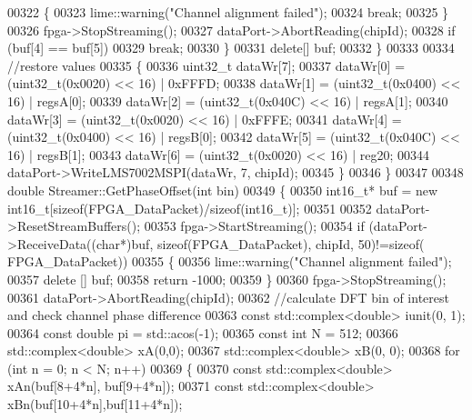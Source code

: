 \begin{DoxyCode}
00322             \{
00323                 lime::warning(\textcolor{stringliteral}{"Channel alignment failed"});
00324                 \textcolor{keywordflow}{break};
00325             \}
00326             fpga->StopStreaming();
00327             dataPort->AbortReading(chipId);
00328             \textcolor{keywordflow}{if} (buf[4] == buf[5])
00329                 \textcolor{keywordflow}{break};
00330         \}
00331         \textcolor{keyword}{delete}[] buf;
00332     \}
00333 
00334     \textcolor{comment}{//restore values}
00335     \{
00336         uint32\_t dataWr[7];
00337         dataWr[0] = (uint32\_t(0x0020) << 16) | 0xFFFD;
00338         dataWr[1] = (uint32\_t(0x0400) << 16) | regsA[0];
00339         dataWr[2] = (uint32\_t(0x040C) << 16) | regsA[1];
00340         dataWr[3] = (uint32\_t(0x0020) << 16) | 0xFFFE;
00341         dataWr[4] = (uint32\_t(0x0400) << 16) | regsB[0];
00342         dataWr[5] = (uint32\_t(0x040C) << 16) | regsB[1];
00343         dataWr[6] = (uint32\_t(0x0020) << 16) | reg20;
00344         dataPort->WriteLMS7002MSPI(dataWr, 7, chipId);
00345     \}
00346 \}
00347 
00348 \textcolor{keywordtype}{double} Streamer::GetPhaseOffset(\textcolor{keywordtype}{int} bin)
00349 \{
00350     int16\_t* buf = \textcolor{keyword}{new} int16\_t[\textcolor{keyword}{sizeof}(FPGA_DataPacket)/\textcolor{keyword}{sizeof}(int16\_t)];
00351 
00352     dataPort->ResetStreamBuffers();
00353     fpga->StartStreaming();
00354     \textcolor{keywordflow}{if} (dataPort->ReceiveData((\textcolor{keywordtype}{char}*)buf, \textcolor{keyword}{sizeof}(FPGA_DataPacket), chipId, 50)!=\textcolor{keyword}{sizeof}(
      FPGA_DataPacket))
00355     \{
00356         lime::warning(\textcolor{stringliteral}{"Channel alignment failed"});
00357         \textcolor{keyword}{delete} [] buf;
00358         \textcolor{keywordflow}{return} -1000;
00359     \}
00360     fpga->StopStreaming();
00361     dataPort->AbortReading(chipId);
00362     \textcolor{comment}{//calculate DFT bin of interest and check channel phase difference}
00363     \textcolor{keyword}{const} std::complex<double> iunit(0, 1);
00364     \textcolor{keyword}{const} \textcolor{keywordtype}{double} pi = std::acos(-1);
00365     \textcolor{keyword}{const} \textcolor{keywordtype}{int} N = 512;
00366     std::complex<double> xA(0,0);
00367     std::complex<double> xB(0, 0);
00368     \textcolor{keywordflow}{for} (\textcolor{keywordtype}{int} n = 0; n < N; n++)
00369     \{
00370         \textcolor{keyword}{const} std::complex<double> xAn(buf[8+4*n], buf[9+4*n]);
00371         \textcolor{keyword}{const} std::complex<double> xBn(buf[10+4*n],buf[11+4*n]);

\end{DoxyCode}
